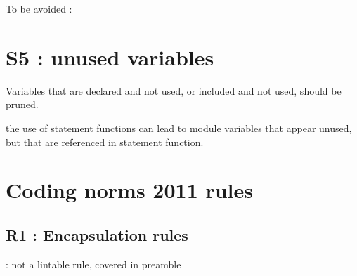 \documentclass[letterpaper,10pt,english]{sphinxmanual}
\begin{document}
\sphinxAtStartPar
To be avoided :
\def\sphinxLiteralBlockLabel{\label{\detokenize{rules/S4:id1}}}
\begin{sphinxVerbatim}[commandchars=\\\{\}]

\end{sphinxVerbatim}

\sphinxstepscope


\section{S5 : unused variables}
\label{\detokenize{rules/S5:s5-unused-variables}}\label{\detokenize{rules/S5::doc}}
\sphinxAtStartPar
Variables that are declared and not used, or included and not used, should be pruned.

\sphinxAtStartPar
{}
the use of statement functions can lead to module variables that appear unused, but that are
referenced in statement function.

\sphinxstepscope


\section{Coding norms 2011 rules}
\label{\detokenize{obsolescent/index:coding-norms-2011-rules}}\label{\detokenize{obsolescent/index::doc}}
\sphinxstepscope


\subsection{R1 : Encapsulation rules}
\label{\detokenize{obsolescent/r1:r1-encapsulation-rules}}\label{\detokenize{obsolescent/r1::doc}}
\sphinxAtStartPar
{}: not a lintable rule, covered in preamble
\end{document}
